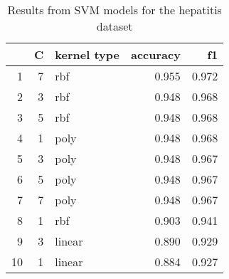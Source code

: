 \begin{table}
\centering
\caption{Results from SVM models for the hepatitis dataset}
\label{tab:svm_results_hepatitis}
\begin{tabular}{rrlrr}
\toprule
 & C & kernel type & accuracy & f1 \\
\midrule
1 & 7 & rbf & 0.955 & 0.972 \\
2 & 3 & rbf & 0.948 & 0.968 \\
3 & 5 & rbf & 0.948 & 0.968 \\
4 & 1 & poly & 0.948 & 0.968 \\
5 & 3 & poly & 0.948 & 0.967 \\
6 & 5 & poly & 0.948 & 0.967 \\
7 & 7 & poly & 0.948 & 0.967 \\
8 & 1 & rbf & 0.903 & 0.941 \\
9 & 3 & linear & 0.890 & 0.929 \\
10 & 1 & linear & 0.884 & 0.927 \\
\bottomrule
\end{tabular}
\end{table}
